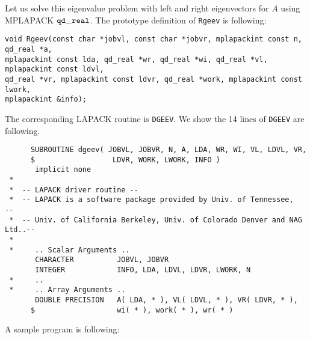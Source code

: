 \documentclass[12pt]{article}
\begin{document}
Let us solve this eigenvalue problem with left and right eigenvectors for $A$ using MPLAPACK $\tt qd\_real$.
The prototype definition of {\tt Rgeev} is following:
\begin{verbatim}
void Rgeev(const char *jobvl, const char *jobvr, mplapackint const n, qd_real *a,
mplapackint const lda, qd_real *wr, qd_real *wi, qd_real *vl, mplapackint const ldvl, 
qd_real *vr, mplapackint const ldvr, qd_real *work, mplapackint const lwork, 
mplapackint &info);
\end{verbatim}
The corresponding LAPACK routine is {\tt DGEEV}. We show the 14 lines of {\tt DGEEV} are following. 
\begin{verbatim}
      SUBROUTINE dgeev( JOBVL, JOBVR, N, A, LDA, WR, WI, VL, LDVL, VR,
      $                  LDVR, WORK, LWORK, INFO )
       implicit none
 *
 *  -- LAPACK driver routine --
 *  -- LAPACK is a software package provided by Univ. of Tennessee,    --
 *  -- Univ. of California Berkeley, Univ. of Colorado Denver and NAG Ltd..--
 *
 *     .. Scalar Arguments ..
       CHARACTER          JOBVL, JOBVR
       INTEGER            INFO, LDA, LDVL, LDVR, LWORK, N
 *     ..
 *     .. Array Arguments ..
       DOUBLE PRECISION   A( LDA, * ), VL( LDVL, * ), VR( LDVR, * ),
      $                   wi( * ), work( * ), wr( * )
\end{verbatim}
A sample program is following:
\end{document}
